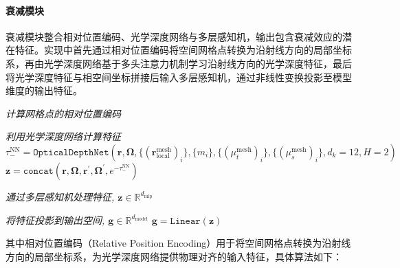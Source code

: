 \paragraph{衰减模块} 衰减模块整合相对位置编码、光学深度网络与多层感知机，输出包含衰减效应的潜在特征。实现中首先通过相对位置编码将空间网格点转换为沿射线方向的局部坐标系，再由光学深度网络基于多头注意力机制学习沿射线方向的光学深度特征，最后将光学深度特征与相空间坐标拼接后输入多层感知机，通过非线性变换投影至模型维度的输出特征。

\begin{algorithm}[htp!]
    \caption{衰减模块（Attenuation Module）}\label{alg:code-attenuation-module}
    \SetAlgoLined

    \BlankLine

    \emph{计算网格点的相对位置编码}\;

    \emph{利用光学深度网络计算特征}\;
    $\tau_{-}^{\text{NN}} = \texttt{OpticalDepthNet}(\boldsymbol{r},\boldsymbol{\Omega},\{{(\boldsymbol{r}^\text{mesh}_{\text{local}})}_i\}, \{m_i\}, \{{(\mu_t^{\text{mesh}})}_i\},\{{(\mu_s^{\text{mesh}})}_i\}, d_k=12, H=2)$\;
    $\bm{z} = \texttt{concat}(\boldsymbol{r}, \boldsymbol{\Omega}, \boldsymbol{r}^{\prime}, \boldsymbol{\Omega}^{\prime}, e^{-\tau_{-}^{\text{NN}}})$\;

    \emph{通过多层感知机处理特征, $\bm{z} \in \mathbb{R}^{d_{\text{mlp}}}$}\;

    \emph{将特征投影到输出空间, $\bm{g} \in \mathbb{R}^{d_{\text{model}}}$}\;
    $\bm{g} = \texttt{Linear}(\bm{z})$\;

    \;
\end{algorithm}

其中相对位置编码（Relative Position Encoding）用于将空间网格点转换为沿射线方向的局部坐标系，为光学深度网络提供物理对齐的输入特征，具体算法如下：

